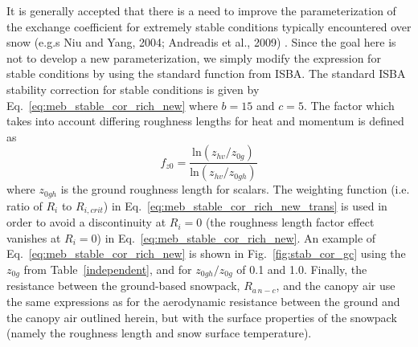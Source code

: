 %
It is generally accepted 
that there is a need to improve the parameterization of the exchange
coefficient for
extremely stable conditions typically encountered over snow
(e.g.s Niu and Yang, 2004; Andreadis et al., 2009)
\nocite{niu_yang_2004,andreadis_ea_2009}.
%
Since the goal here is not to develop a new parameterization,
we simply modify the expression for stable conditions
by using the standard function from ISBA. 
The standard ISBA stability correction for stable conditions is given
by Eq.~\ref{eq:meb_stable_cor_rich_new}
where $b=15$ and $c=5$.
The factor which takes into account differing roughness lengths for heat and momentum
is defined as
%
\begin{equation}
  \label{eq:meb_stable_cor_rich_orig_isba}
f_{z0} = 
{\frac{ {\mathrm{ln}}\left(z_{hv}/z_{0g}   \right) }
      { {\mathrm{ln}}\left(z_{hv}/z_{0gh}\right) } }
%
\end{equation}
%
where $z_{0gh}$ is the ground roughness length for scalars.
The weighting function (i.e. ratio of $R_i$ to $R_{i,crit}$) in Eq.~\ref{eq:meb_stable_cor_rich_new_trans} 
is used in order to avoid a discontinuity at $R_i=0$ (the roughness length factor effect vanishes at $R_i=0$)
in Eq.~\ref{eq:meb_stable_cor_rich_new}.
%
%
An example of Eq.~\ref{eq:meb_stable_cor_rich_new} 
is shown in Fig.~\ref{fig:stab_cor_gc} using the $z_{0g}$ from
Table~\ref{independent}, 
and for $z_{0gh}/z_{0g}$ of 0.1 and 1.0.
%
Finally, the resistance between the ground-based snowpack, $R_{a\,n-c}$, and the canopy air
use the same expressions as for the aerodynamic resistance between the
ground and the canopy air outlined herein, but with the surface
properties of the snowpack (namely the roughness length and snow surface temperature).



